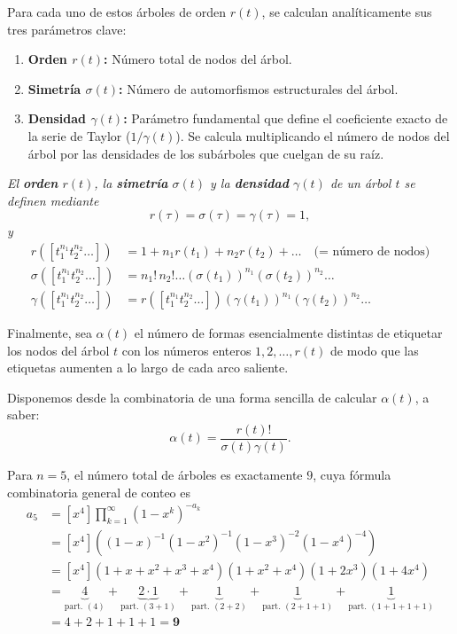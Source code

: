 Para cada uno de estos árboles de orden $r(t)$, se calculan analíticamente sus tres parámetros clave:
\begin{enumerate}
    \item \textbf{Orden $r(t)$:} Número total de nodos del árbol.
    \item \textbf{Simetría $\sigma(t)$:} Número de automorfismos estructurales del árbol.
    \item \textbf{Densidad $\gamma(t)$:} Parámetro fundamental que define el coeficiente exacto de la serie de Taylor ($1/\gamma(t)$). Se calcula multiplicando el número de nodos del árbol por las densidades de los subárboles que cuelgan de su raíz.
\end{enumerate}
\begin{defi} \textit{El \textbf{orden} $r(t)$, la \textbf{simetría} $\sigma(t)$ y la \textbf{densidad} $\gamma(t)$ de un árbol $t$ se definen mediante}
\begin{equation*}
    r(\tau) = \sigma(\tau) = \gamma(\tau) = 1,
\end{equation*}
\textit{y}
\begin{align*}
    r([t_1^{n_1} t_2^{n_2} \dots]) &= 1 + n_1 r(t_1) + n_2 r(t_2) + \dots \quad \text{(= número de nodos)} \\
    \sigma([t_1^{n_1} t_2^{n_2} \dots]) &= n_1! \, n_2! \dots (\sigma(t_1))^{n_1} (\sigma(t_2))^{n_2} \dots \\
    \gamma([t_1^{n_1} t_2^{n_2} \dots]) &= r([t_1^{n_1} t_2^{n_2} \dots]) (\gamma(t_1))^{n_1} (\gamma(t_2))^{n_2} \dots
\end{align*}

\noindent Finalmente, sea $\alpha(t)$ el número de formas esencialmente distintas de etiquetar los nodos del árbol $t$ con los números enteros $1, 2, \dots, r(t)$ de modo que las etiquetas aumenten a lo largo de cada arco saliente.

Disponemos desde la combinatoria de una forma sencilla de calcular $\alpha(t)$, a saber:
\begin{equation*}
    \alpha(t) = \frac{r(t)!}{\sigma(t) \gamma(t)}.
\end{equation*}
\end{defi}







Para $n = 5$, el número total de árboles es exactamente $9$, cuya fórmula combinatoria general de conteo es
\begin{align*}
a_5 &= [x^4] \prod_{k=1}^{\infty} (1 - x^k)^{-a_k} \\[0.5em]
&= [x^4] \left( (1-x)^{-1} (1-x^2)^{-1} (1-x^3)^{-2} (1-x^4)^{-4} \right) \\[0.5em]
&= [x^4] \left(1 + x + x^2 + x^3 + x^4\right) \left(1 + x^2 + x^4\right) \left(1 + 2x^3\right) \left(1 + 4x^4\right) \\[0.5em]
&= \underbrace{4}_{\text{part. } (4)} + \underbrace{2 \cdot 1}_{\text{part. } (3+1)} + \underbrace{1}_{\text{part. } (2+2)} + \underbrace{1}_{\text{part. } (2+1+1)} + \underbrace{1}_{\text{part. } (1+1+1+1)} \\[0.5em]
&= 4 + 2 + 1 + 1 + 1 = \mathbf{9}
\end{align*}

